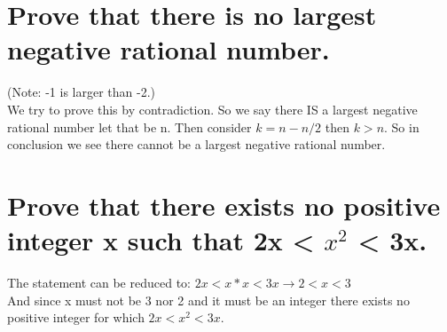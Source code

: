 \section{Prove that there is no largest negative rational number.}
(Note: -1 is larger than -2.)\\
We try to prove this by contradiction. So we say there IS a largest negative rational number let that be n.
Then consider $k=n-n/2$ then $k>n$. So in conclusion we see there cannot be a largest negative rational number.

\section{Prove that there exists no positive integer x such that 2x < $x^2$ < 3x.}
The statement can be reduced to: $2x<x*x<3x\rightarrow2<x<3$\\
And since x must not be 3 nor 2 and it must be an integer there exists no positive integer for which $2x<x^2<3x$.

